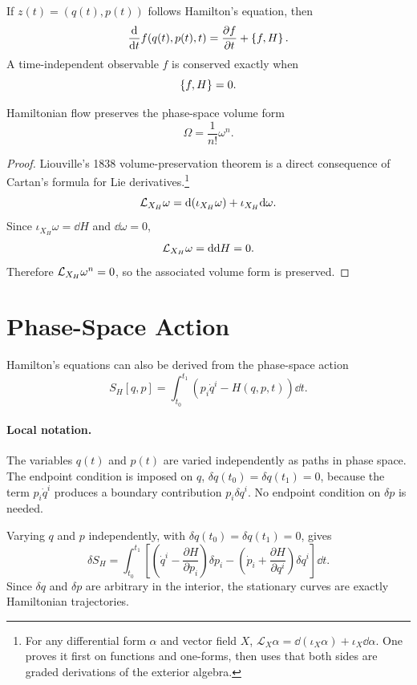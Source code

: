 If \(z(t)=(q(t),p(t))\) follows Hamilton's equation, then
\[
  \frac{\mathrm{d}}{\mathrm{d} t}f(q(t),p(t),t)
  =
  \frac{\partial f}{\partial t}+\left\{f,H\right\}.
\]
A time-independent observable \(f\) is conserved exactly when
\[
  \left\{f,H\right\}=0.
\]

\begin{proposition}
Hamiltonian flow preserves the phase-space volume form
\[
  \Omega=\frac{1}{n!}\omega^n.
\]
\end{proposition}

\begin{proof}
Liouville's 1838 volume-preservation theorem is a direct consequence of
Cartan's formula for Lie derivatives.\footnote{For any differential form
\(\alpha\) and vector
field \(X\), \(\mathcal L_X\alpha=\dd(\iota_X\alpha)+\iota_X\dd\alpha\). One
proves it first on functions and one-forms, then uses that both sides are
graded derivations of the exterior algebra.}
\[
  \mathcal{L}_{X_H}\omega=\mathrm{d}(\iota_{X_H}\omega)+\iota_{X_H}\mathrm{d}\omega.
\]
Since \(\iota_{X_H}\omega=\dd H\) and \(\dd\omega=0\),
\[
  \mathcal{L}_{X_H}\omega=\mathrm{d}\mathrm{d} H=0.
\]
Therefore \(\mathcal{L}_{X_H}\omega^n=0\), so the associated volume form is preserved.
\end{proof}

\section{Phase-Space Action}
\label{sec:phase-space-action}

Hamilton's equations can also be derived from the phase-space action
\[
  S_H[q,p]=\int_{t_0}^{t_1}\left(p_i\dot q^i-H(q,p,t)\right)\dd t.
\]

\paragraph{Local notation.}
The variables \(q(t)\) and \(p(t)\) are varied independently as paths in
phase space.  The endpoint condition is imposed on \(q\),
\(\delta q(t_0)=\delta q(t_1)=0\), because the term \(p_i\dot q^i\) produces a
boundary contribution \(p_i\delta q^i\).  No endpoint condition on
\(\delta p\) is needed.

Varying \(q\) and \(p\) independently, with \(\delta q(t_0)=\delta q(t_1)=0\),
gives
\[
  \delta S_H
  =
  \int_{t_0}^{t_1}
  \left[
    \left(\dot q^i-\frac{\partial H}{\partial p_i}\right)\delta p_i
    -
    \left(\dot p_i+\frac{\partial H}{\partial q^i}\right)\delta q^i
  \right]\dd t.
\]
Since \(\delta q\) and \(\delta p\) are arbitrary in the interior, the
stationary curves are exactly Hamiltonian trajectories.

